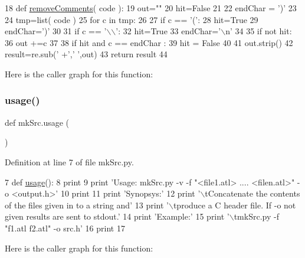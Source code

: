 \begin{DoxyCode}
18 \textcolor{keyword}{def }\hyperlink{namespacemkSrc_a2295e28381950f839d54f2db1af19d21}{removeComments}( code ):
19     out=\textcolor{stringliteral}{""}
20     hit=\textcolor{keyword}{False}
21 
22     endChar = \textcolor{stringliteral}{')'}
23 
24     tmp=list( code )
25     \textcolor{keywordflow}{for} c \textcolor{keywordflow}{in} tmp:
26         
27         \textcolor{keywordflow}{if} c == \textcolor{stringliteral}{'('}:
28             hit=\textcolor{keyword}{True}
29             endChar=\textcolor{stringliteral}{')'}
30 
31         \textcolor{keywordflow}{if} c == \textcolor{stringliteral}{'\(\backslash\)\(\backslash\)'}:
32             hit=\textcolor{keyword}{True}
33             endChar=\textcolor{stringliteral}{'\(\backslash\)n'}
34 
35         \textcolor{keywordflow}{if} \textcolor{keywordflow}{not} hit:
36             out +=c
37         
38         \textcolor{keywordflow}{if} hit \textcolor{keywordflow}{and} c == endChar :
39             hit = \textcolor{keyword}{False}
40 
41     out.strip()
42     result=re.sub(\textcolor{stringliteral}{' +'},\textcolor{stringliteral}{' '},out)
43     \textcolor{keywordflow}{return} result
44 
\end{DoxyCode}
Here is the caller graph for this function\+:
\mbox{\label{namespacemkSrc_a2912f80b0972d6bef1ca6d6bd8dd97f8}} 
\subsubsection{\texorpdfstring{usage()}{usage()}}
{\footnotesize\ttfamily def mk\+Src.\+usage (\begin{DoxyParamCaption}{ }\end{DoxyParamCaption})}



Definition at line 7 of file mk\+Src.\+py.


\begin{DoxyCode}
7 \textcolor{keyword}{def }\hyperlink{namespacemkSrc_a2912f80b0972d6bef1ca6d6bd8dd97f8}{usage}():
8     \textcolor{keywordflow}{print}
9     \textcolor{keywordflow}{print} \textcolor{stringliteral}{'Usage: mkSrc.py -v -f "<file1.atl> .... <filen.atl>" -o <output.h>'}
10     \textcolor{keywordflow}{print}
11     \textcolor{keywordflow}{print} \textcolor{stringliteral}{'Synopsys:'}
12     \textcolor{keywordflow}{print} \textcolor{stringliteral}{'\(\backslash\)tConcatenate the contents of the files given in to a string and'}
13     \textcolor{keywordflow}{print} \textcolor{stringliteral}{'\(\backslash\)tproduce a C header file.  If -o not given results are sent to stdout.'}
14     \textcolor{keywordflow}{print} \textcolor{stringliteral}{'Example:'}
15     \textcolor{keywordflow}{print} \textcolor{stringliteral}{'\(\backslash\)tmkSrc.py -f "f1.atl f2.atl" -o src.h'}
16     \textcolor{keywordflow}{print}
17 
\end{DoxyCode}
Here is the caller graph for this function\+:
